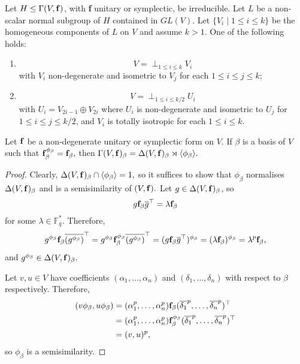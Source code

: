 \begin{Lem} \label{ashb}
Let $H \le \Gamma(V, {\bf f})$, with {\bf f} unitary or symplectic, be irreducible. Let $L$ be a non-scalar normal subgroup of $H$ contained in $GL(V)$. Let $\{V_i \mid 1 \le i\le k\}$ be the homogeneous components of $L$ on
$V$ and assume $k > 1$. One of the following holds:
\begin{enumerate}[font=\normalfont]
\item  $$ \displaystyle V=\mathop{\bot}_{1 \le i\le k} V_i$$ 
 with $V_i$ non-degenerate and isometric to $V_j$ for each $1 \le i \le j \le k $;
\item  $$ \displaystyle V=\mathop{\bot}_{1 \le i\le k/2} U_i$$ with $U_i=V_{2i-1} \oplus V_{2i}$ where $U_i$ is non-degenerate and isometric to $U_j$ for 
$1 \le i \le j \le k / 2$,
and $V_i$ is totally isotropic for each $1 \le i \le k$.
\end{enumerate}
\end{Lem}


\begin{Lem}
\label{uniGamsdp}
Let ${\bf f}$ be a non-degenerate unitary or symplectic form on $V.$ If $\beta$ is a basis of $V$ such that ${\bf f}_{\beta}^{\phi_{\beta}}={\bf f}_{\beta},$ then 
$\Gamma(V,{\bf f})_{\beta}= \Delta(V,{\bf f})_{\beta} \rtimes \langle \phi_{\beta} \rangle.$ 
\end{Lem}
\begin{proof}
Clearly, $\Delta(V,{\bf f})_{\beta} \cap \langle \phi_{\beta} \rangle=1,$ so it suffices to show that $\phi_{\beta}$ normalises $\Delta(V,{\bf f})_{\beta}$ and  is a semisimilarity of $(V, {\bf f}).$ Let $g \in \Delta(V,{\bf f})_{\beta}$, so 
$$g {\bf f}_{\beta} \overline{g}^{\top}=\lambda {\bf f}_{\beta}$$
for some $\lambda \in \mathbb{F}_q^*.$ Therefore,
$$g^{\phi_{\beta}} {\bf f}_{\beta} \overline{(g^{\phi_{\beta}})}^{\top}=g^{\phi_{\beta}} {\bf f}_{\beta}^{\phi_{\beta}} \overline{(g^{\phi_{\beta}})}^{\top}=(g {\bf f}_{\beta} \overline{g}^{\top})^{\phi_{\beta}}= (\lambda {\bf f}_{\beta})^{\phi_{\beta}}= \lambda^p {\bf f}_{\beta}, $$
and $g^{\phi_{\beta}} \in \Delta(V,{\bf f})_{\beta}.$  

Let $v,u \in V$ have coefficients $(\alpha_1, \ldots, \alpha_n)$ and $(\delta_1, \ldots, \delta_n)$ with respect to $\beta$ respectively. Therefore,
\begin{align*}(v\phi_{\beta},u \phi_{\beta}) & =(\alpha_1^p, \ldots, \alpha_n^p){\bf f}_{\beta}(\overline{\delta_1}^p, \ldots, \overline{\delta_n}^p)^{\top}\\
& =(\alpha_1^p, \ldots, \alpha_n^p){\bf f}_{\beta}^{\phi_{\beta}}(\overline{\delta_1}^p, \ldots, \overline{\delta_n}^p)^{\top}\\
& =(v,u)^p,
\end{align*}
so $\phi_{\beta}$ is a semisimilarity.
\end{proof}





